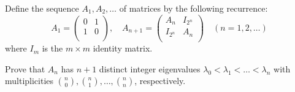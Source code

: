 Define the sequence \(A_1,A_2,\ldots\) of matrices by the following recurrence: \[ A_1 = \begin{pmatrix} 0 & 1 \\ 1 & 0 \\ \end{pmatrix}, \quad A_{n+1} = \begin{pmatrix} A_n & I_{2^n} \\ I_{2^n} & A_n \\ \end{pmatrix} \quad (n=1,2,\ldots) \]where \(I_m\) is the \(m\times m\) identity matrix.

Prove that \(A_n\) has \(n+1\) distinct integer eigenvalues \(\lambda_0< \lambda_1<\ldots <\lambda_n\) with multiplicities \(\binom{n}{0},\binom{n}{1},\ldots,\binom{n}{n}\), respectively.